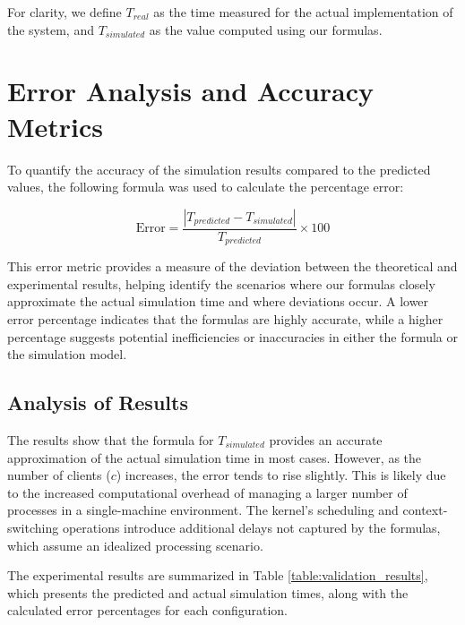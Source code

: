 For clarity, we define \( T_{real} \) as the time measured for the actual implementation of the system, and \( T_{simulated} \) as the value computed using our formulas.

\section{Error Analysis and Accuracy Metrics}

To quantify the accuracy of the simulation results compared to the predicted values, the following formula was used to calculate the percentage error:

\[
    \text{Error} = \frac{|T_{predicted} - T_{simulated}|}{T_{predicted}} \times 100
\]

This error metric provides a measure of the deviation between the theoretical and experimental results, helping identify the scenarios where our formulas closely approximate the actual simulation time and where deviations occur. A lower error percentage indicates that the formulas are highly accurate, while a higher percentage suggests potential inefficiencies or inaccuracies in either the formula or the simulation model.

\subsection{Analysis of Results}

The results show that the formula for \( T_{simulated} \) provides an accurate approximation of the actual simulation time in most cases. However, as the number of clients (\( c \)) increases, the error tends to rise slightly. This is likely due to the increased computational overhead of managing a larger number of processes in a single-machine environment. The kernel’s scheduling and context-switching operations introduce additional delays not captured by the formulas, which assume an idealized processing scenario.

The experimental results are summarized in Table \ref{table:validation_results}, which presents the predicted and actual simulation times, along with the calculated error percentages for each configuration.

